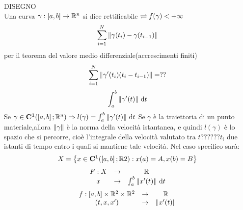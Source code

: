 DISEGNO\\
Una curva $\gamma : \left[a,b\right] \to \mathbb{R}^n$ si dice rettificabile $\rightleftharpoons f(\gamma)<+\infty$
\observation
\[\sum\limits_{i=1}^{N}\left\|\gamma(t_i)-\gamma(t_{i-1})\right\| \]
per il teorema del valore medio differenziale(accrescimenti finiti)
\[\sum\limits_{i=1}^{N}\left\| \gamma'(t_i)(t_i-t_{i-1})\right\| =??\]
\[\int_{a}^{b}\left\| \gamma'(t)\right\| \,\mathrm{d}{t}\]
\proposition
Se $\gamma\in \mathbf{C^{1}}(\left[a,b\right]; \mathbb{R} ^n)\Rightarrow l(\gamma)=\int_a^b\left\|\gamma'(t)\right\|\,\mathrm{d}{t}$
\observation
Se $\gamma$ è la traiettoria di un punto materiale,allora $\left\|\gamma\right\|$ è la norma della velocità istantanea, e quindi $l(\gamma)$ è lo spazio che si percorre, cioè l'integrale della velocità valutato tra $t??????t_i$ due istanti di tempo entro i quali si mantiene tale velocità.
\observation
Nel caso specifico sarà:
\[ X=\left\{ x\in \mathbf{C^{1}}(\left[a,b\right]; \mathbb{R} 2): x(a)=A, x(b)=B \right\} \]
\[\begin{array}{ccc} 
F: X & \to & \mathbb{R} \\
x & \to & \int_{a}^b \left\|x'(t)\right\|\,\mathrm{d}{t}
\end{array}\]
\[\begin{array}{ccc} 
f: \left[a,b\right]\times \mathbb{R} ^2\times \mathbb{R} ^2 & \to & \mathbb{R} \\
(t,x, x') & \to &  \left\|x'(t)\right\|
\end{array}\]
\newpage
